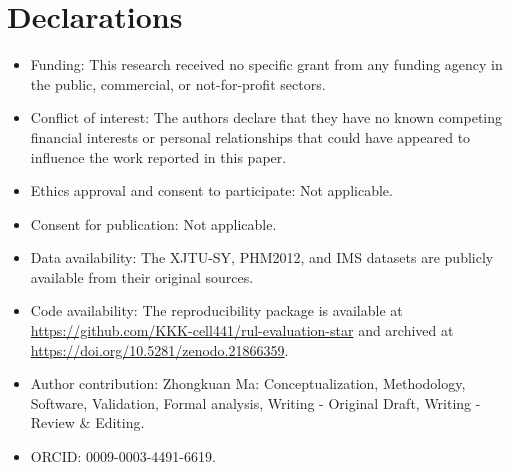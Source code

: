 \documentclass[pdflatex,sn-mathphys-num]{sn-jnl}
\begin{document}
\section*{Declarations}
\begin{itemize}
\item Funding: This research received no specific grant from any funding agency in the public, commercial, or not-for-profit sectors.
\item Conflict of interest: The authors declare that they have no known competing financial interests or personal relationships that could have appeared to influence the work reported in this paper.
\item Ethics approval and consent to participate: Not applicable.
\item Consent for publication: Not applicable.
\item Data availability: The XJTU-SY, PHM2012, and IMS datasets are publicly available from their original sources.
\item Code availability: The reproducibility package is available at \url{https://github.com/KKK-cell441/rul-evaluation-star} and archived at \url{https://doi.org/10.5281/zenodo.21866359}.
\item Author contribution: Zhongkuan Ma: Conceptualization, Methodology, Software, Validation, Formal analysis, Writing - Original Draft, Writing - Review \& Editing.
\item ORCID: 0009-0003-4491-6619.
\end{itemize}
\end{document}
